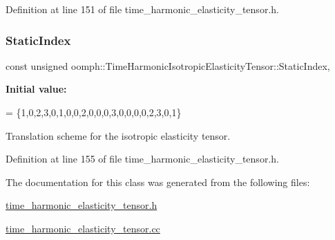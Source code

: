 Definition at line 151 of file time\+\_\+harmonic\+\_\+elasticity\+\_\+tensor.\+h.

\mbox{\label{classoomph_1_1TimeHarmonicIsotropicElasticityTensor_a28d880860aa3de7cfc6ebc07ec0a5ee9}} 
\subsubsection{\texorpdfstring{Static\+Index}{StaticIndex}}
{\footnotesize\ttfamily const unsigned oomph\+::\+Time\+Harmonic\+Isotropic\+Elasticity\+Tensor\+::\+Static\+Index\hspace{0.3cm}{\ttfamily [static]}, {\ttfamily [private]}}

{\bfseries Initial value\+:}
\begin{DoxyCode}
=
 \{1,0,2,3,0,1,0,0,2,0,0,0,3,0,0,0,0,2,3,0,1\}
\end{DoxyCode}


Translation scheme for the isotropic elasticity tensor. 



Definition at line 155 of file time\+\_\+harmonic\+\_\+elasticity\+\_\+tensor.\+h.



The documentation for this class was generated from the following files\+:\begin{DoxyCompactItemize}
\item 
\hyperlink{time__harmonic__elasticity__tensor_8h}{time\+\_\+harmonic\+\_\+elasticity\+\_\+tensor.\+h}\item 
\hyperlink{time__harmonic__elasticity__tensor_8cc}{time\+\_\+harmonic\+\_\+elasticity\+\_\+tensor.\+cc}\end{DoxyCompactItemize}
